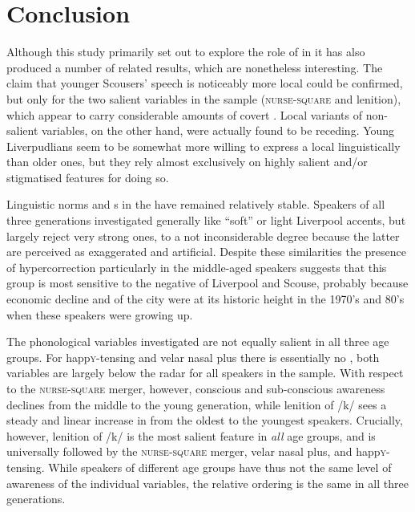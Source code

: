 \chapter{Conclusion}
\label{ch.conclusion}

Although this study primarily set out to explore the role of  in   it has also produced a number of related results, which are nonetheless interesting.
The claim that younger Scousers' speech is noticeably more local \parencite[cf.][]{watson2007a} could be confirmed, but only for the two salient variables in the sample (\textsc{nurse}-\textsc{square} and lenition), which appear to carry considerable amounts of covert .
Local variants of non-salient variables, on the other hand, were actually found to be receding.
Young Liverpudlians seem to be somewhat more willing to express a local  linguistically than older ones, but they rely almost exclusively on highly salient and/or stigmatised features for doing so.

Linguistic norms and s in the  have remained relatively stable.
Speakers of all three generations investigated generally like ``soft'' or light Liverpool accents, but largely reject very strong ones, to a not inconsiderable degree because the latter are perceived as exaggerated and artificial.
Despite these similarities the presence of hypercorrection particularly in the middle-aged speakers suggests that this group is most sensitive to the negative  of Liverpool and Scouse, probably because economic decline and  of the city were at its historic height in the 1970's and 80's when these speakers were growing up.

The phonological variables investigated are not equally salient in all three age groups.
For happ\textsc{y}-tensing and velar nasal plus there is essentially no , both variables are largely below the radar for all speakers in the sample.
With respect to the \textsc{nurse}-\textsc{square} merger, however, conscious and sub-conscious awareness declines from the middle to the young generation, while lenition of /k/ sees a steady and linear increase in  from the oldest to the youngest speakers.
Crucially, however, lenition of /k/ is the most salient feature in \emph{all} age groups, and is universally followed by the \textsc{nurse}-\textsc{square} merger, velar nasal plus, and happ\textsc{y}-tensing.
While speakers of different age groups have thus not the same level of awareness of the individual variables, the relative ordering is the same in all three generations.

